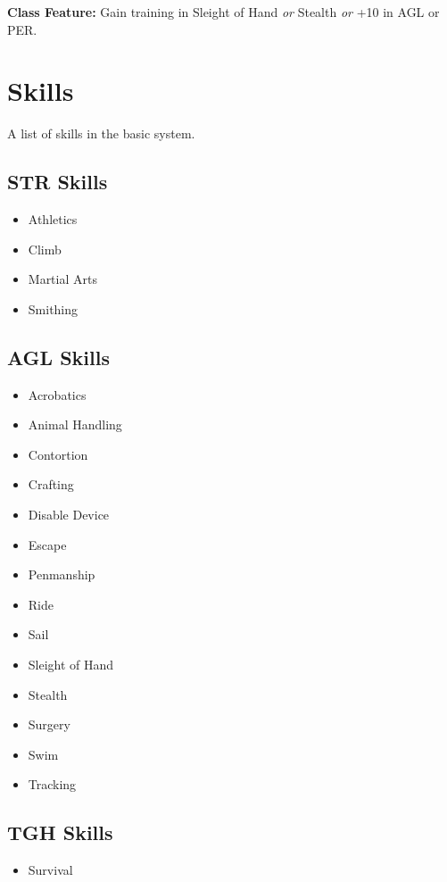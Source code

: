 \documentclass[]{article}
\providecommand{\tightlist}{%
  \setlength{\itemsep}{0pt}\setlength{\parskip}{0pt}}
\begin{document}
\textbf{Class Feature:} Gain training in Sleight of Hand \emph{or}
Stealth \emph{or} +10 in AGL or PER.

\section{Skills}\label{skills-1}

A list of skills in the basic system.

\subsection{STR Skills}\label{str-skills}

\begin{itemize}
\tightlist
\item
  Athletics
\item
  Climb
\item
  Martial Arts
\item
  Smithing
\end{itemize}

\subsection{AGL Skills}\label{agl-skills}

\begin{itemize}
\tightlist
\item
  Acrobatics
\item
  Animal Handling
\item
  Contortion
\item
  Crafting
\item
  Disable Device
\item
  Escape
\item
  Penmanship
\item
  Ride
\item
  Sail
\item
  Sleight of Hand
\item
  Stealth
\item
  Surgery
\item
  Swim
\item
  Tracking
\end{itemize}

\subsection{TGH Skills}\label{tgh-skills}

\begin{itemize}
\tightlist
\item
  Survival
\end{itemize}
\end{document}

